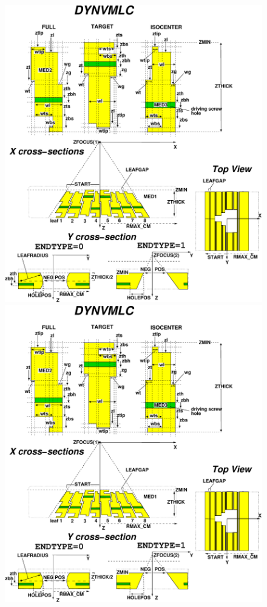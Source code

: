 \documentclass[12pt,twoside]{article}
\begin{document}
\begin{figure}[htpb]
\begin{center}
\vspace*{-0.7cm}
\leavevmode
\begin{latexonly}
\hspace*{-1cm}
\includegraphics[width=18.5cm]{figures/dynvmlcd}
\end{latexonly}
\begin{htmlonly}
\includegraphics[width=13cm]{figures/dynvmlcd}

\end{htmlonly}
\end{center}
\end{figure}
\end{document}
